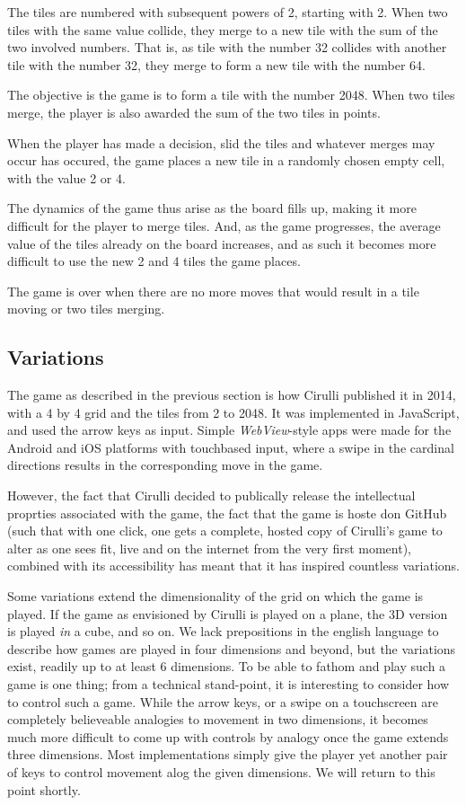 \documentclass[a4paper, 12pt]{article}
\begin{document}
The tiles are numbered with subsequent powers of 2, starting with
2. When two tiles with the same value collide, they merge to a new
tile with the sum of the two involved numbers. That is, as tile with
the number 32 collides with another tile with the number 32, they
merge to form a new tile with the number 64.

The objective is the game is to form a tile with the number 2048. When
two tiles merge, the player is also awarded the sum of the two tiles
in points.

When the player has made a decision, slid the tiles and whatever
merges may occur has occured, the game places a new tile in a randomly
chosen empty cell, with the value 2 or 4.

The dynamics of the game thus arise as the board fills up, making it
more difficult for the player to merge tiles. And, as the game
progresses, the average value of the tiles already on the board
increases, and as such it becomes more difficult to use the new 2 and
4 tiles the game places.

The game is over when there are no more moves that would result in a
tile moving or two tiles merging.

\subsection{Variations}

The game as described in the previous section is how Cirulli published
it in 2014, with a 4 by 4 grid and the tiles from 2 to 2048. It was
implemented in JavaScript, and used the arrow keys as input. Simple
\emph{WebView}-style apps were made for the Android and iOS platforms
with touchbased input, where a swipe in the cardinal directions
results in the corresponding move in the game.

However, the fact that Cirulli decided to publically release the
intellectual proprties associated with the game, the fact that the
game is hoste don GitHub (such that with one click, one gets a
complete, hosted copy of Cirulli's game to alter as one sees fit, live
and on the internet from the very first moment), combined with its
accessibility has meant that it has inspired countless variations.

Some variations extend the dimensionality of the grid on which the
game is played. If the game as envisioned by Cirulli is played on a
plane, the 3D version is played \emph{in} a cube, and so on. We lack
prepositions in the english language to describe how games are played
in four dimensions and beyond, but the variations exist, readily up to
at least 6 dimensions. To be able to fathom and play such a game is
one thing; from a technical stand-point, it is interesting to consider
how to control such a game. While the arrow keys, or a swipe on a
touchscreen are completely believeable analogies to movement in two
dimensions, it becomes much more difficult to come up with controls by
analogy once the game extends three dimensions. Most implementations
simply give the player yet another pair of keys to control movement
alog the given dimensions. We will return to this point shortly.
\end{document}
